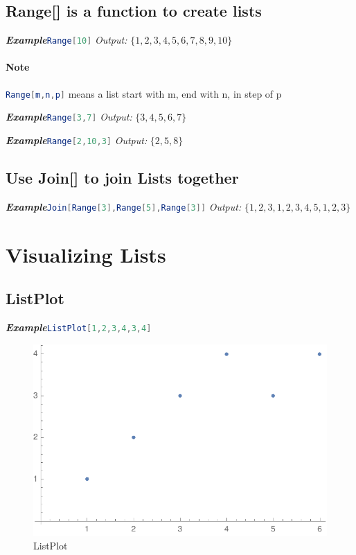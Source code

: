 \documentclass[10pt]{book}
\begin{document}
\subsection{Range[] is a function to create lists}

\noindent\emph{\textbf{Example}}\quad \lstinline[language=Mathematica]|Range[10]| \hspace{\fill}\emph{Output:} $\{1,2,3,4,5,6,7,8,9,10\}$

\paragraph{Note}\lstinline[language=Mathematica]|Range[m,n,p]| means a list start with m, end with n, in step of p

\noindent\emph{\textbf{Example}}\quad \lstinline[language=Mathematica]|Range[3,7]| \hspace{\fill}\emph{Output:} $\{3,4,5,6,7\}$

\noindent\emph{\textbf{Example}}\quad \lstinline[language=Mathematica]|Range[2,10,3]| \hspace{\fill}\emph{Output:} $\{2,5,8\}$





\subsection{Use Join[] to join Lists together}

\noindent\emph{\textbf{Example}}\quad \lstinline[language=Mathematica]|Join[Range[3],Range[5],Range[3]]| \hspace{\fill}\emph{Output:} $\{1,2,3,1,2,3,4,5,1,2,3\}$




\section{Visualizing Lists}

\subsection{ListPlot}

\emph{\textbf{Example}}\quad\lstinline[language=Mathematica]|ListPlot[1,2,3,4,3,4]|
\begin{figure}[H]
  \centering
  \includegraphics[width=0.45\linewidth]{figures/ListPlot}
  \caption{ListPlot}
\end{figure}
\end{document}
